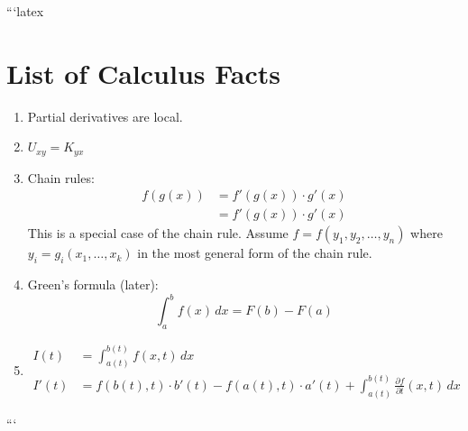 ```latex
\section*{List of Calculus Facts}

\begin{enumerate}
    \item Partial derivatives are local.
    
    \item $U_{xy} = K_{yx}$
    
    \item Chain rules:
    \begin{align*}
        f(g(x)) &= f'(g(x)) \cdot g'(x) \\
        &= f'(g(x)) \cdot g'(x)
    \end{align*}
    This is a special case of the chain rule. Assume $f = f(y_1, y_2, \ldots, y_n)$ where $y_i = g_i(x_1, \ldots, x_k)$ in the most general form of the chain rule.
    
    \item Green's formula (later):
    \[
    \int_{a}^{b} f(x) \, dx = F(b) - F(a)
    \]
    
    \item 
    \begin{align*}
        I(t) &= \int_{a(t)}^{b(t)} f(x, t) \, dx \\
        I'(t) &= f(b(t), t) \cdot b'(t) - f(a(t), t) \cdot a'(t) + \int_{a(t)}^{b(t)} \frac{\partial f}{\partial t}(x, t) \, dx
    \end{align*}
\end{enumerate}
```
